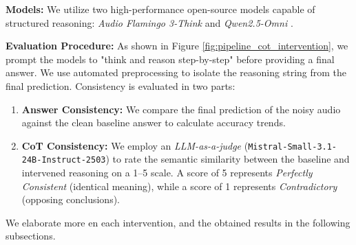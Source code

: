 \documentclass{Interspeech}
\begin{document}
\noindent \textbf{Models:} We utilize two high-performance open-source models capable of structured reasoning: \textit{Audio Flamingo 3-Think} \cite{goel2025audioflamingo3advancing} and \textit{Qwen2.5-Omni} \cite{Qwen2.5-Omni}.

\noindent \textbf{Evaluation Procedure:} As shown in Figure \ref{fig:pipeline_cot_intervention}, we prompt the models to "think and reason step-by-step" before providing a final answer. We use automated preprocessing to isolate the reasoning string from the final prediction. Consistency is evaluated in two parts:
\begin{enumerate}
    \item \textbf{Answer Consistency:} We compare the final prediction of the noisy audio against the clean baseline answer to calculate accuracy trends.
    \item \textbf{CoT Consistency:} We employ an \textit{LLM-as-a-judge} (\texttt{Mistral-Small-3.1-24B-Instruct-2503}) to rate the semantic similarity between the baseline and intervened reasoning on a 1--5 scale. A score of 5 represents \textit{Perfectly Consistent} (identical meaning), while a score of 1 represents \textit{Contradictory} (opposing conclusions).
\end{enumerate}
We elaborate more en each intervention, and the obtained results in the following subsections. 














\end{document}
